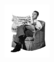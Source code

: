 
\begin{titlepage}

\begin{addmargin}[-1cm]{-3cm}
\begin{center}
\large

\hfill
\vfill

\begingroup
\color{Maroon}
\spacedallcaps{\myTitle} \\ \bigskip %
\endgroup

\spacedlowsmallcaps{\myName} %

\vfill

\includegraphics[width=2cm]{img/reading-the-newspaper} \\ \medskip %

\myDepartment \\
\myUni \\ \bigskip

\myTime%

\vfill

\end{center}
\end{addmargin}

\end{titlepage}